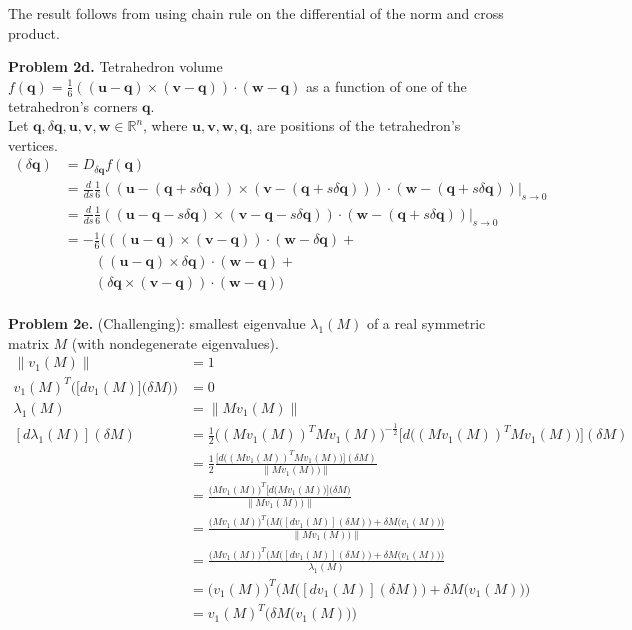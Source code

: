 \documentclass[11pt]{article}
\newcommand{\bq}{\mathbf{q}}
\newcommand{\bu}{\mathbf{u}}
\newcommand{\bv}{\mathbf{v}}
\newcommand{\bw}{\mathbf{w}}
\begin{document}
\noindent The result follows from using chain rule on the differential of the norm and cross product.

\pagebreak

\noindent \textbf{Problem 2d.}
Tetrahedron volume $f(\bq) = \frac{1}{6} ((\bu - \bq) \times (\bv-\bq)) \cdot (\bw -\bq)$ as a function of one of the tetrahedron's corners $\bq$. \\

\noindent Let $\bq, \delta \bq, \bu, \bv, \bw \in \mathbb{R}^n$, where $\bu, \bv, \bw, \bq$, are positions of the tetrahedron's vertices.
\begin{align*}
[df(\bq)](\delta \bq) 
    &= D_{\delta \bq} f(\bq) \\
    &= \frac{d}{ds} \frac{1}{6} ((\bu - (\bq + s \delta \bq)) \times (\bv - (\bq + s \delta \bq))) \cdot (\bw - (\bq + s \delta \bq)) \Big|_{s \to 0} \\
    &= \frac{d}{ds} \frac{1}{6} ((\bu - \bq - s \delta \bq) \times (\bv - \bq - s \delta \bq)) \cdot (\bw - (\bq + s \delta \bq)) \Big|_{s \to 0} \\
    &= - \frac{1}{6} \big(((\bu - \bq) \times (\bv - \bq)) \cdot (\bw - \delta \bq) + \\
    & \ \ \ \ \ \ \ \ \ \ ((\bu - \bq) \times \delta \bq) \cdot (\bw - \bq) + \\
    & \ \ \ \ \ \ \ \ \ \ (\delta \bq \times (\bv - \bq)) \cdot (\bw - \bq) \big) \\ 
\end{align*}

\noindent \textbf{Problem 2e.}
(Challenging): smallest eigenvalue $\lambda_1(M)$ of a real symmetric matrix $M$ (with nondegenerate eigenvalues).
\begin{align*}
\|v_1(M)\|
    &= 1 \\
v_1(M)^T \Big(\big[d v_1(M)\big]\big(\delta M\big)\Big)
    &= 0 \\
\lambda_1(M)
    &= \|M v_1(M)\| \\
[d \lambda_1(M)](\delta M)
    &= \frac{1}{2} \Big((M v_1(M))^T M v_1(M)\Big)^{-\frac{1}{2}} \Big[d \Big((M v_1(M))^T M v_1(M)\Big)\Big](\delta M) \\
    &= \frac{1}{2} \frac{\Big[d \Big((M v_1(M))^T M v_1(M)\Big)\Big](\delta M)}{\|M v_1(M))\|} \\
    &= \frac{\Big(M v_1(M)\Big)^T \Big[d \big(M v_1(M)\big)\Big]\Big(\delta M\Big)}{\|M v_1(M))\|} \\
    &= \frac{\Big(M v_1(M)\Big)^T \Big(M\big([d v_1(M)](\delta M)\big) + \delta M \big(v_1(M)\big)\Big)}{\|M v_1(M))\|} \\
    &= \frac{\Big(M v_1(M)\Big)^T \Big(M\big([d v_1(M)](\delta M)\big) + \delta M \big(v_1(M)\big)\Big)}{\lambda_1(M)} \\
    &= \Big(v_1(M)\Big)^T \Big(M\big([d v_1(M)](\delta M)\big) + \delta M \big(v_1(M)\big)\Big) \\
    &= v_1(M)^T \Big(\delta M \big(v_1(M)\big)\Big) \\
\end{align*}
\end{document}
